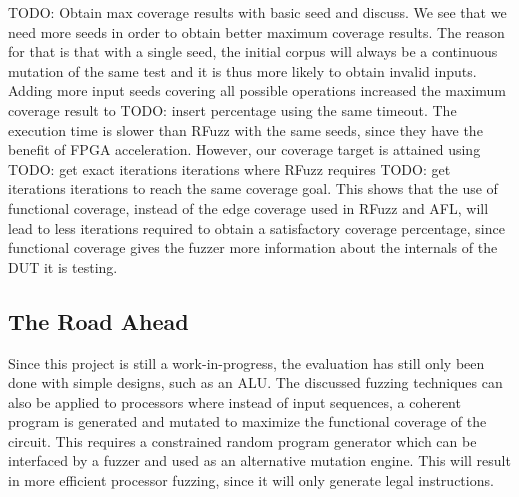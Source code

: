 \documentclass[conference]{IEEEtran}
\newcommand{\todo}[1]{{\color{olive} TODO: #1}}
\begin{document}
\todo{Obtain max coverage results with basic seed and discuss.}
We see that we need more seeds in order to obtain better maximum coverage results. 
The reason for that is that with a single seed, the initial corpus will always be a continuous mutation of the same test and it is thus more likely to obtain invalid inputs.
Adding more input seeds covering all possible operations increased the maximum coverage result to \todo{insert percentage} using the same timeout.
The execution time is slower than RFuzz with the same seeds, since they have the benefit of FPGA acceleration.
However, our coverage target is attained using \todo{get exact iterations} iterations where RFuzz requires \todo{get iterations} iterations to reach the same coverage goal.
This shows that the use of functional coverage, instead of the edge coverage used in RFuzz and AFL, will lead to less iterations required to obtain a satisfactory coverage percentage, since functional coverage gives the fuzzer more information about the internals of the DUT it is testing.

\subsection{The Road Ahead}
Since this project is still a work-in-progress, the evaluation has still only been done with simple designs, such as an ALU.
The discussed fuzzing techniques can also be applied to processors where instead of input sequences, a coherent program is generated and mutated to maximize the functional coverage of the circuit. 
This requires a constrained random program generator which can be interfaced by a fuzzer and used as an alternative mutation engine.
This will result in more efficient processor fuzzing, since it will only generate legal instructions. 
\end{document}
